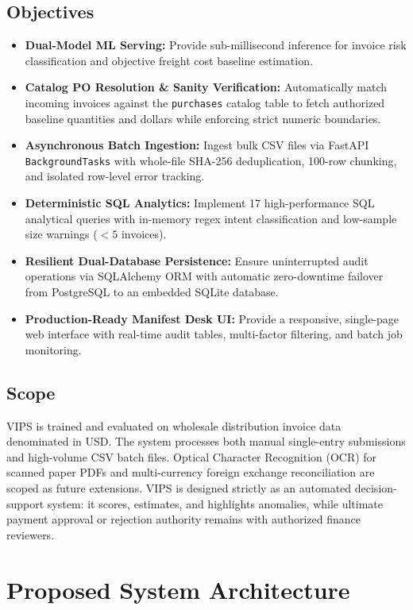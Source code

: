 \documentclass[conference]{IEEEtran}
\begin{document}
\subsection{Objectives}
\begin{itemize}
    \item \textbf{Dual-Model ML Serving:} Provide sub-millisecond inference for invoice risk classification and objective freight cost baseline estimation.
    \item \textbf{Catalog PO Resolution \& Sanity Verification:} Automatically match incoming invoices against the \texttt{purchases} catalog table to fetch authorized baseline quantities and dollars while enforcing strict numeric boundaries.
    \item \textbf{Asynchronous Batch Ingestion:} Ingest bulk CSV files via FastAPI \texttt{BackgroundTasks} with whole-file SHA-256 deduplication, 100-row chunking, and isolated row-level error tracking.
    \item \textbf{Deterministic SQL Analytics:} Implement 17 high-performance SQL analytical queries with in-memory regex intent classification and low-sample size warnings ($<5$ invoices).
    \item \textbf{Resilient Dual-Database Persistence:} Ensure uninterrupted audit operations via SQLAlchemy ORM with automatic zero-downtime failover from PostgreSQL to an embedded SQLite database.
    \item \textbf{Production-Ready Manifest Desk UI:} Provide a responsive, single-page web interface with real-time audit tables, multi-factor filtering, and batch job monitoring.
\end{itemize}

\subsection{Scope}
VIPS is trained and evaluated on wholesale distribution invoice data denominated in USD. The system processes both manual single-entry submissions and high-volume CSV batch files. Optical Character Recognition (OCR) for scanned paper PDFs and multi-currency foreign exchange reconciliation are scoped as future extensions. VIPS is designed strictly as an automated decision-support system: it scores, estimates, and highlights anomalies, while ultimate payment approval or rejection authority remains with authorized finance reviewers.

\section{Proposed System Architecture}
\end{document}
